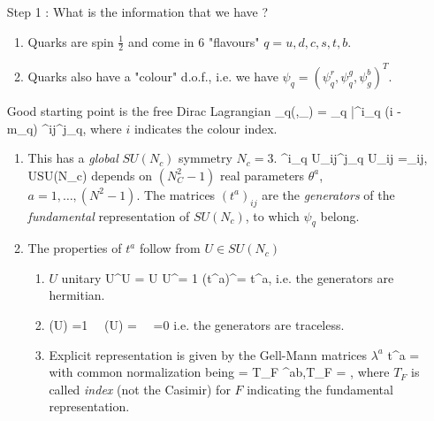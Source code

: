 \begin{enumerate} 
	\item[Step 1]:
	What is the information that we have ?
	\begin{enumerate}
		\item Quarks are spin $\frac{1}{2}$ and come in $6$ "flavours" $q=u,d,c,s,t,b$.
		\item Quarks also have a "colour" d.o.f., i.e. we have $\psi_q = (\psi^r_q,\psi^g_q,\psi^b_g)^T$.
	\end{enumerate}
	Good starting point is the free Dirac Lagrangian
	\bse 
	\mL_q(\psi,\partial_\mu \psi) = \sum_q \bar{\psi}^i_q (i \slashed{\partial}-m_q) \delta^{ij}\psi^j_q,
	\ese 
	where $i$ indicates the colour index.
	\begin{enumerate}
		\item This has a \emph{global} $SU(N_c)$ symmetry $N_c=3$.
		\bse 
		\psi^i_q \rightarrow U_{ij}\psi^j_q  U_{ij} =_{ij}, \; U\in SU(N_c)
		\ese 
		depends on $(N^2_C-1)$ real parameters $\theta^a$, $a=1,\dots,(N^2-1)$. The matrices $(t^a)_{ij}$ are the \emph{generators} of the \emph{fundamental} representation of $SU(N_c)$, to which $\psi_q$ belong.
		\item The properties of $t^a$ follow from $U\in SU(N_c)$ 
		\begin{enumerate}
			\item $U$ unitary 
			\bse 
			U^\dagger U = U  U^\dagger = 1 \quad \Rightarrow \quad (t^a)^\dagger = t^a,
			\ese 
			i.e. the generators are hermitian.
			\item
			\bse 
			\det(U) =1 \,  \Rightarrow \, \det(U) = \exp \left[-i g_s \Tr{t^a}\right] \, \Rightarrow\, =0
			\ese 
			i.e. the generators are traceless.
			\item Explicit representation is given by the Gell-Mann matrices $\lambda^a$
			\bse 
			t^a = 
			\ese 
			with common normalization being
			\bse 
			 = T_F \delta^{ab},\qquad T_F = ,
			\ese 
			where $T_F$ is called \emph{index} (not the Casimir) for $F$ indicating the fundamental representation.
		\end{enumerate}
	\end{enumerate}
	

\end{enumerate}
